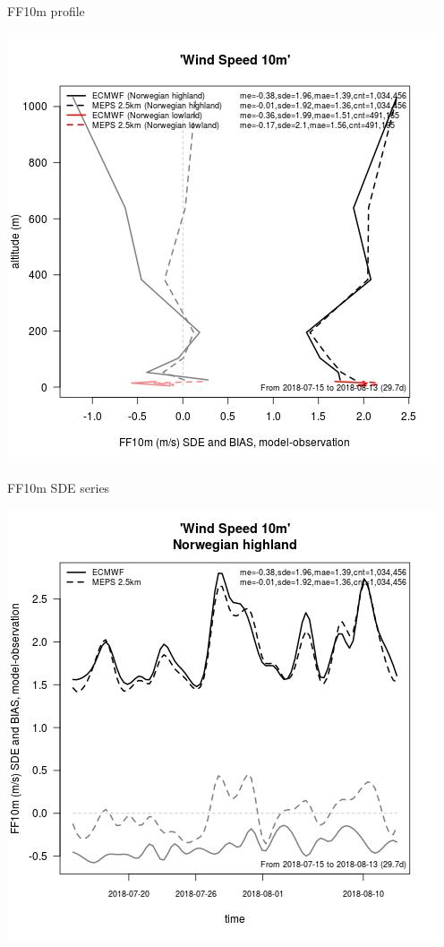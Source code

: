 \documentclass[letterpaper,10pt,twoside,twocolumn,openany]{book}
\begin{document}
{\begin{paperbox}{FF10m profile}
  \centerline{\includegraphics[width=0.75\columnwidth]{ff10m_prof.jpg}}
\end{paperbox}

\begin{paperbox}{FF10m SDE series}
  \centerline{\includegraphics[width=0.8\columnwidth]{ff10m_series_hl.jpg}}
\end{paperbox}

}
\end{document}
